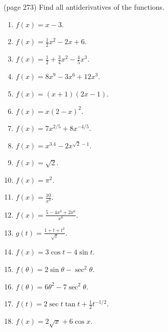 \begin{problem}(page 273)
Find all antiderivatives of the functions.
\begin{multicols}{3}
\begin{enumerate}
\item $f(x)=x-3$.
\item $f(x)=\frac12 x^2-2x+6$.

\item $f(x)=\frac12 +\frac34x^2-\frac45x^3$.
\item $f(x)=8x^9-3x^6+12x^3$.

\item $f(x)=(x+1)(2x-1)$.
\item $f(x)=x(2-x)^2$.

\item $f(x)=7x^{2/5}+8x^{-4/5}$.
\item $f(x)=x^{3.4}-2x^{\sqrt{2}-1}$.

\item $f(x)=\sqrt {2}$.
\item $f(x)=\pi^2$.

\item $f(x)=\frac{10}{x^9}$.
\item $f(x)=\frac{5-4x^3+2x^6}{x^6}$.

\item $g(t)=\frac{1+t+t^2}{\sqrt{t}}$.
\item $f(x)=3\cos t-4\sin t$.

\item $f(\theta)=2\sin \theta-\sec^2\theta$.
\item $f(\theta)=6\theta^2-7\sec^2\theta$.

\item $f(t)=2\sec t \tan t +\frac12 t^{-1/2}$.
\item $f(x)=2\sqrt{x}+6\cos x$.

\end{enumerate}
\end{multicols}

\end{problem}